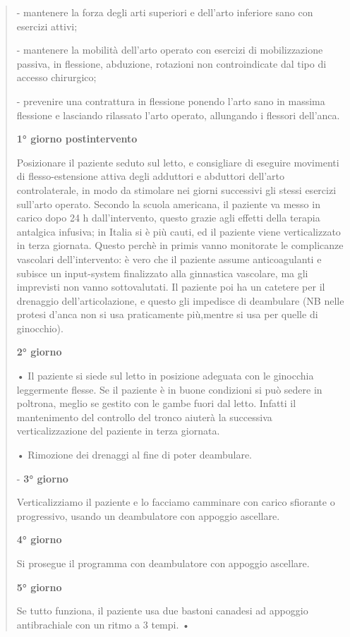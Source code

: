 \documentclass[]{article}
\begin{document}
\begin{quote}
- mantenere la forza degli arti superiori e dell'arto inferiore sano con
esercizi attivi;

- mantenere la mobilità dell'arto operato con esercizi di mobilizzazione
passiva, in flessione, abduzione, rotazioni non controindicate dal tipo
di accesso chirurgico;

- prevenire una contrattura in flessione ponendo l'arto sano in massima
flessione e lasciando rilassato l'arto operato, allungando i flessori
dell'anca.

\textbf{1° giorno postintervento}

Posizionare il paziente seduto sul letto, e consigliare di eseguire
movimenti di flesso-estensione attiva degli adduttori e abduttori
dell'arto controlaterale, in modo da stimolare nei giorni successivi gli
stessi esercizi sull'arto operato. Secondo la scuola americana, il
paziente va messo in carico dopo 24 h dall'intervento, questo grazie
agli effetti della terapia antalgica infusiva; in Italia si è più cauti,
ed il paziente viene verticalizzato in terza giornata. Questo perchè in
primis vanno monitorate le complicanze vascolari dell'intervento: è vero
che il paziente assume anticoagulanti e subisce un input-system
finalizzato alla ginnastica vascolare, ma gli imprevisti non vanno
sottovalutati. Il paziente poi ha un catetere per il drenaggio
dell'articolazione, e questo gli impedisce di deambulare (NB nelle
protesi d'anca non si usa praticamente più,mentre si usa per quelle di
ginocchio).

\textbf{2° giorno}

• Il paziente si siede sul letto in posizione adeguata con le ginocchia
leggermente flesse. Se il paziente è in buone condizioni si può sedere
in poltrona, meglio se gestito con le gambe fuori dal letto. Infatti il
mantenimento del controllo del tronco aiuterà la successiva
verticalizzazione del paziente in terza giornata.

• Rimozione dei drenaggi al fine di poter deambulare.

- \textbf{3° giorno}

Verticalizziamo il paziente e lo facciamo camminare con carico sfiorante
o progressivo, usando un deambulatore con appoggio ascellare.

\textbf{4° giorno}

Si prosegue il programma con deambulatore con appoggio ascellare.

\textbf{5° giorno}

Se tutto funziona, il paziente usa due bastoni canadesi ad appoggio
antibrachiale con un ritmo a 3 tempi. •


\end{quote}
\end{document}
